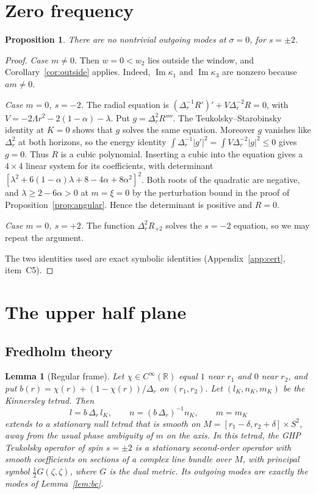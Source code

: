 \documentclass[11pt]{amsart}
\newtheorem{proposition}[theorem]{Proposition}
\newtheorem{lemma}[theorem]{Lemma}
\theoremstyle{definition}
\theoremstyle{remark}
\numberwithin{equation}{section}
\newcommand{\R}{\mathbb{R}}
\renewcommand{\Im}{\operatorname{Im}}
\begin{document}
\section{Zero frequency}\label{sec:zero}
\begin{proposition}\label{prop:zero}
There are no nontrivial outgoing modes at $\sigma=0$, for $s=\pm2$.
\end{proposition}
\begin{proof}
\emph{Case $m\ne0$.} Then $w=0<w_2$ lies outside the window, and Corollary~\ref{cor:outside} applies. Indeed,
$\Im\kappa_1$ and $\Im\kappa_3$ are nonzero because $am\ne0$.

\emph{Case $m=0$, $s=-2$.} The radial equation is $(\Delta_r^{-1}R')'+V\Delta_r^{-2}R=0$, with
$V=-2\Lambda r^2-2(1-\alpha)-\lambda$. Put $g=\Delta_r^2R''''$. The Teukolsky--Starobinsky identity at $K=0$ shows
that $g$ solves the same equation. Moreover $g$ vanishes like $\Delta_r^2$ at both horizons, so the energy identity
$\int\Delta_r^{-1}|g'|^2=\int V\Delta_r^{-2}|g|^2\le0$ gives $g=0$. Thus $R$ is a cubic polynomial. Inserting a cubic into the equation gives a $4\times4$ linear system for its
coefficients, with determinant $[\lambda^2+6(1-\alpha)\lambda+8-4\alpha+8\alpha^2]^2$. Both roots of the quadratic
are negative, and $\lambda\ge2-6\alpha>0$ at $m=\xi=0$ by the perturbation bound in the proof of
Proposition~\ref{prop:angular}. Hence the determinant is positive and $R=0$.

\emph{Case $m=0$, $s=+2$.} The function $\Delta_r^2R_{+2}$ solves the $s=-2$ equation, so we may repeat the argument.

The two identities used are exact symbolic identities (Appendix~\ref{app:cert}, item~C5).
\end{proof}

\section{The upper half plane}\label{sec:uhp}

\subsection{Fredholm theory}
\begin{lemma}[Regular frame]\label{lem:regframe}
Let $\chi\in C^\infty(\R)$ equal $1$ near $r_1$ and $0$ near $r_2$, and put $b(r)=\chi(r)+(1-\chi(r))/\Delta_r$ on
$(r_1,r_2)$. Let $(l_K,n_K,m_K)$ be the Kinnersley tetrad. Then
\[
l=b\,\Delta_r\,l_K,\qquad n=(b\,\Delta_r)^{-1}n_K,\qquad m=m_K
\]
extends to a stationary null tetrad that is smooth on $M=[r_1-\delta,r_2+\delta]\times S^2$, away from the usual phase
ambiguity of $m$ on the axis. In this tetrad, the GHP Teukolsky operator of spin $s=\pm2$ is a stationary second-order
operator with smooth coefficients on sections of a complex line bundle over $M$, with principal symbol
$\frac12G(\zeta,\zeta)$, where $G$ is the dual metric. Its outgoing modes are exactly the modes of
Lemma~\ref{lem:bc}.
\end{lemma}
\end{document}
